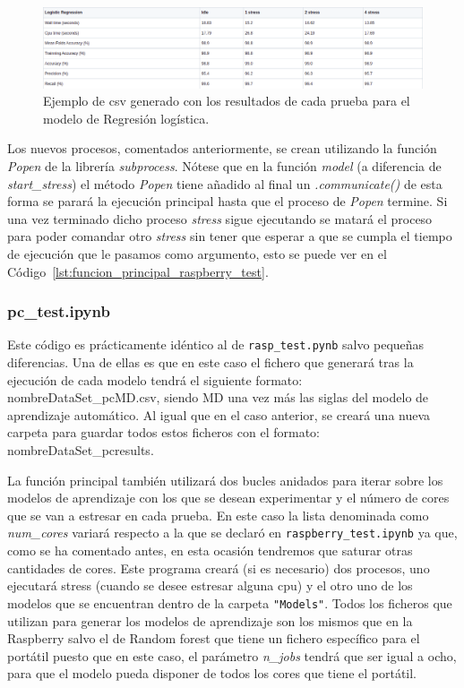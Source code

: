 \documentclass[a4paper, 12pt]{book}
\begin{document}
\begin{figure}[]
  \centering
  \includegraphics[width=16cm, keepaspectratio]{img/ejemplo_csv.png}
  \caption{Ejemplo de csv generado con los resultados de cada prueba para el modelo de Regresión logística.}\label{fig:ejemplo_csv}
\end{figure}

Los nuevos procesos, comentados anteriormente, se crean utilizando la función \textit{Popen} de la librería \textit{subprocess}. Nótese que en la función \textit{model} (a diferencia de \textit{start\_stress}) el método \textit{Popen} tiene añadido al final un \textit{.communicate()} de esta forma se parará la ejecución principal hasta que el proceso de \textit{Popen} termine. Si una vez terminado dicho proceso \textit{stress} sigue ejecutando se matará el proceso para poder comandar otro \textit{stress} sin tener que esperar a que se cumpla el tiempo de ejecución que le pasamos como argumento, esto se puede ver en el Código~\ref{lst:funcion_principal_raspberry_test}.

\subsubsection{pc\_test.ipynb}
\label{subsubsec:programa_pruebas_pc}

Este código es prácticamente idéntico al de \texttt{rasp\_test.pynb} salvo pequeñas diferencias. Una de ellas es que en este caso el fichero que generará tras la ejecución de cada modelo tendrá el siguiente formato: nombreDataSet\_pcMD.csv, siendo MD una vez más las siglas del modelo de aprendizaje automático. Al igual que en el caso anterior, se creará una nueva carpeta para guardar todos estos ficheros con el formato: nombreDataSet\_pcresults.

La función principal también utilizará dos bucles anidados para iterar sobre los modelos de aprendizaje con los que se desean experimentar y el número de cores que se van a estresar en cada prueba. En este caso la lista denominada como \textit{num\_cores} variará respecto a la que se declaró en \texttt{raspberry\_test.ipynb} ya que, como se ha comentado antes, en esta ocasión tendremos que saturar otras cantidades de cores. Este programa creará (si es necesario) dos procesos, uno ejecutará stress (cuando se desee estresar alguna cpu) y el otro uno de los modelos que se encuentran dentro de la carpeta \texttt{"Models"}. Todos los ficheros que utilizan para generar los modelos de aprendizaje son los mismos que en la Raspberry salvo el de Random forest que tiene un fichero específico para el portátil puesto que en este caso, el parámetro \textit{n\_jobs} tendrá que ser igual a ocho, para que el modelo pueda disponer de todos los cores que tiene el portátil. 
\end{document}
